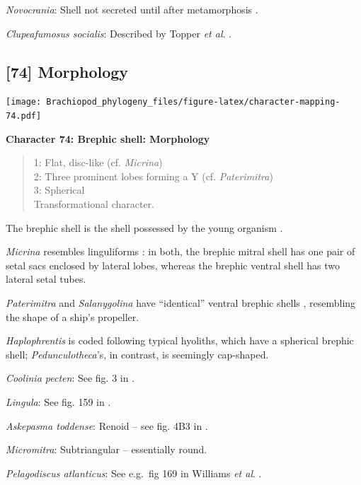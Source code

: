 \documentclass[]{book}
\theoremstyle{definition}
\theoremstyle{definition}
\theoremstyle{definition}
\theoremstyle{remark}
\begin{document}
\emph{Novocrania}: Shell not secreted until after metamorphosis
\citep{Popov2010Earliestontogeny}.

\emph{Clupeafumosus socialis}: Described by Topper \emph{et al}.
\citeyearpar{Topper2013Reappraisalof}.

\hypertarget{morphology}{%
\subsection*{{[}74{]} Morphology}\label{morphology}}

\texttt{[image: Brachiopod\_phylogeny\_files/figure-latex/character-mapping-74.pdf]}

\textbf{Character 74: Brephic shell: Morphology}

\begin{quote}
1: Flat, disc-like (cf. \emph{Micrina})\\
2: Three prominent lobes forming a Y (cf. \emph{Paterimitra})\\
3: Spherical\\
Transformational character.
\end{quote}

The brephic shell is the shell possessed by the young organism
\citep[see][ and references therein for discussion of
terminology]{Ushatinskaya2016Revisionof}.

\emph{Micrina} resembles linguliforms \citep{Holmer2011Firstrecord}: in
both, the brephic mitral shell has one pair of setal sacs enclosed by
lateral lobes, whereas the brephic ventral shell has two lateral setal
tubes.

\emph{Paterimitra} and \emph{Salanygolina} have ``identical'' ventral
brephic shells \citep{Holmer2011Firstrecord}, resembling the shape of a
ship's propeller.

\emph{Haplophrentis} is coded following typical hyoliths, which have a
spherical brephic shell; \emph{Pedunculotheca}'s, in contrast, is
seemingly cap-shaped.

\emph{Coolinia pecten}: See fig. 3 in
\citet{Bassett2017Earliestontogeny}.

\emph{Lingula}: See fig. 159 in \citet{Williams1997BrachiopodaRevised}.

\emph{Askepasma toddense}: Renoid -- see fig. 4B3 in
\citet{Topper2013Theoldest}.

\emph{Micromitra}: Subtriangular -- essentially round.

\emph{Pelagodiscus atlanticus}: See e.g.~fig 169 in Williams \emph{et
al}. \citeyearpar{Williams1997BrachiopodaRevised}.
\end{document}
